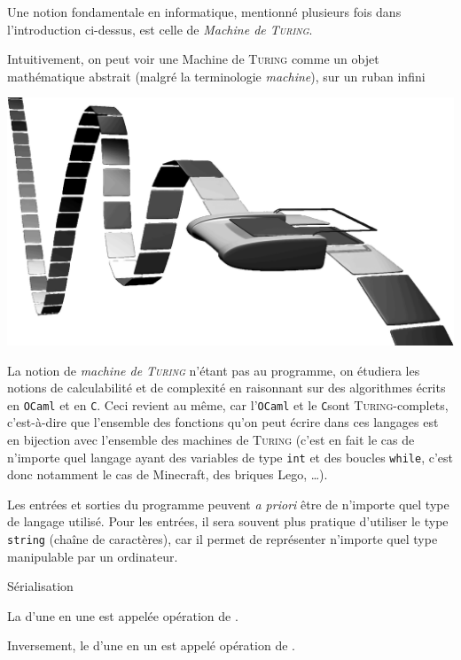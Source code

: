 \documentclass[a4paper,french,bookmarks]{book}
\newcommand{\langOcaml}{\texttt{\color{ocamlColor!20!black}OCaml}}
\newcommand{\langC}{\texttt{\color{ocamlColor!20!black}C}}
\begin{document}
    Une notion fondamentale en informatique, mentionné plusieurs fois dans l'introduction ci-dessus, est celle de \emph{Machine de \textsc{Turing}}.
    
    \begin{minipage}{0.70\linewidth}
         Intuitivement, on peut voir une Machine de \textsc{Turing} comme un objet mathématique abstrait (malgré la terminologie \emph{machine}),  sur un ruban infini
    \end{minipage}
    \hfill
    \begin{minipage}{0.25\linewidth}
        \includegraphics[width=\textwidth]{MPI - Informatique/Cours/Dessin/turingmachine.png}
    \end{minipage}
    
    La notion de \emph{machine de \textsc{Turing}} n'étant pas au programme, on étudiera les notions de calculabilité et de complexité en raisonnant sur des algorithmes écrits en \langOcaml{} et en \langC. Ceci revient au même, car l'\langOcaml{} et le \langC sont \textsc{Turing}-complets, c'est-à-dire que l'ensemble des fonctions qu'on peut écrire dans ces langages est en bijection avec l'ensemble des machines de \textsc{Turing} (c'est en fait le cas de n'importe quel langage ayant des variables de type \texttt{int} et des boucles \texttt{while}, c'est donc notamment le cas de Minecraft\texttrademark, des briques Lego\texttrademark, \dots).\medskip
    
    Les entrées et sorties du programme peuvent \emph{\EBGaramond a priori} être de n'importe quel type de langage utilisé. Pour les entrées, il sera souvent plus pratique d'utiliser le type \texttt{string} (chaîne de caractères), car il permet de représenter n'importe quel type manipulable par un ordinateur.
    
    
    \begin{definition*}{Sérialisation}{}
        \begin{enumerate}
            \itast La  d'une  en une  est appelée opération de . 
            
            \itast Inversement, le  d'une  en un  est appelé opération de  .
        \end{enumerate} 
    \end{definition*}
    
\end{document}
